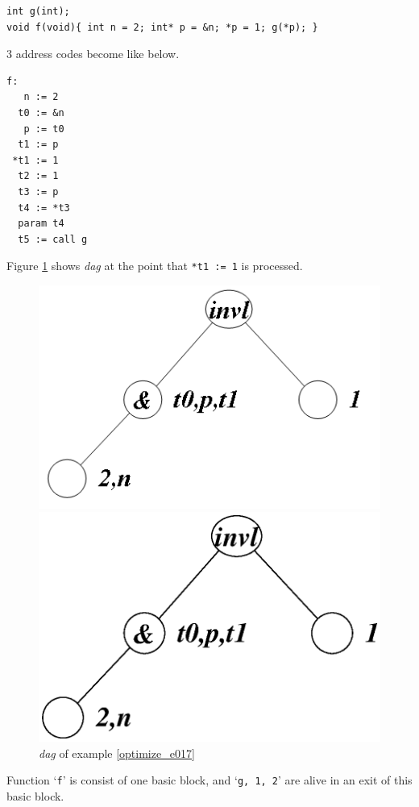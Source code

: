 \begin{Example}
\begin{verbatim}
int g(int);
void f(void){ int n = 2; int* p = &n; *p = 1; g(*p); }
\end{verbatim}
3 address codes become like below.
\begin{verbatim}
f:
   n := 2
  t0 := &n
   p := t0
  t1 := p
 *t1 := 1
  t2 := 1
  t3 := p
  t4 := *t3
  param t4
  t5 := call g
\end{verbatim}
Figure \ref{optimize_e018} shows {\em dag} at the point that
{\tt{*t1 := 1}} is processed.
\begin{figure}[htbp]
\begin{center}
\begin{htmlonly}
\includegraphics[width=0.8\linewidth,height=0.525\linewidth]{opt007.png}
\end{htmlonly}
\begin{latexonly}
\includegraphics[width=0.8\linewidth,height=0.525\linewidth]{opt007.eps}
\end{latexonly}
\caption{{\em dag} of example \ref{optimize_e017}}
\label{optimize_e018}
\end{center}
\end{figure}
Function `{\tt{f}}' is consist of one basic block, and 
`{\tt{g, 1, 2}}' are alive in an exit of this basic block.

\end{Example}
